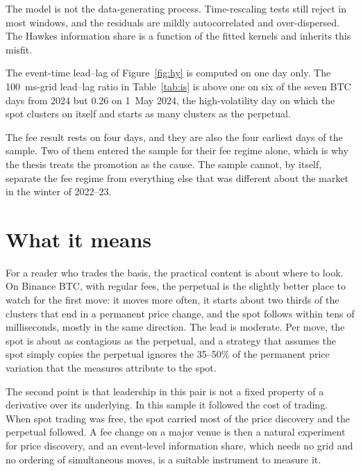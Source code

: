 \documentclass[a4paper,11pt]{article}
\begin{document}
The model is not the data-generating process. Time-rescaling tests still reject in most windows, and the residuals are mildly autocorrelated and over-dispersed. The Hawkes information share is a function of the fitted kernels and inherits this misfit.

The event-time lead--lag of Figure~\ref{fig:hy} is computed on one day only. The 100~ms-grid lead--lag ratio in Table~\ref{tab:is} is above one on six of the seven BTC days from 2024 but 0.26 on 1~May 2024, the high-volatility day on which the spot clusters on itself and starts as many clusters as the perpetual.

The fee result rests on four days, and they are also the four earliest days of the sample. Two of them entered the sample for their fee regime alone, which is why the thesis treats the promotion as the cause. The sample cannot, by itself, separate the fee regime from everything else that was different about the market in the winter of 2022--23.

\section{What it means}

For a reader who trades the basis, the practical content is about where to look. On Binance BTC, with regular fees, the perpetual is the slightly better place to watch for the first move: it moves more often, it starts about two thirds of the clusters that end in a permanent price change, and the spot follows within tens of milliseconds, mostly in the same direction. The lead is moderate. Per move, the spot is about as contagious as the perpetual, and a strategy that assumes the spot simply copies the perpetual ignores the 35--50\% of the permanent price variation that the measures attribute to the spot.

The second point is that leadership in this pair is not a fixed property of a derivative over its underlying. In this sample it followed the cost of trading. When spot trading was free, the spot carried most of the price discovery and the perpetual followed. A fee change on a major venue is then a natural experiment for price discovery, and an event-level information share, which needs no grid and no ordering of simultaneous moves, is a suitable instrument to measure it.
\end{document}
